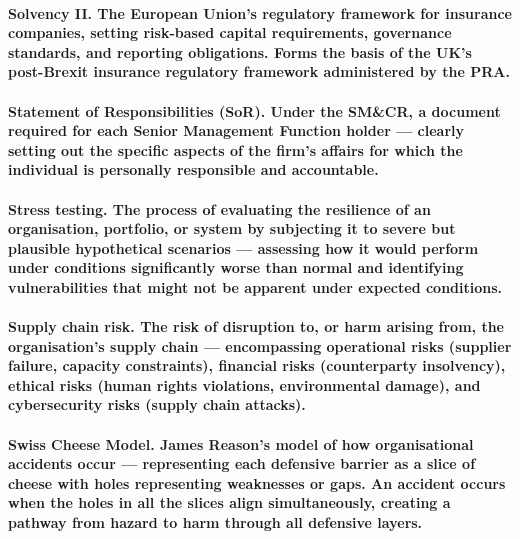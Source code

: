 \paragraph{\textbf{Solvency II}. The European Union's regulatory framework for insurance companies, setting risk-based capital requirements, governance standards, and reporting obligations. Forms the basis of the UK's post-Brexit insurance regulatory framework administered by the PRA.}

\paragraph{\textbf{Statement of Responsibilities (SoR)}. Under the SM\&CR, a document required for each Senior Management Function holder — clearly setting out the specific aspects of the firm's affairs for which the individual is personally responsible and accountable.}

\paragraph{\textbf{Stress testing}. The process of evaluating the resilience of an organisation, portfolio, or system by subjecting it to severe but plausible hypothetical scenarios — assessing how it would perform under conditions significantly worse than normal and identifying vulnerabilities that might not be apparent under expected conditions.}

\paragraph{\textbf{Supply chain risk}. The risk of disruption to, or harm arising from, the organisation's supply chain — encompassing operational risks (supplier failure, capacity constraints), financial risks (counterparty insolvency), ethical risks (human rights violations, environmental damage), and cybersecurity risks (supply chain attacks).}

\paragraph{\textbf{Swiss Cheese Model}. James Reason's model of how organisational accidents occur — representing each defensive barrier as a slice of cheese with holes representing weaknesses or gaps. An accident occurs when the holes in all the slices align simultaneously, creating a pathway from hazard to harm through all defensive layers.}

